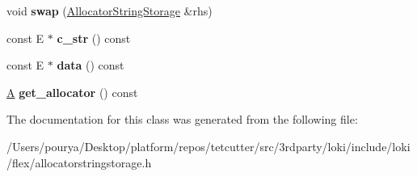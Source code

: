 \begin{DoxyCompactItemize}
\item 
\hypertarget{classAllocatorStringStorage_a39e2135b565f3984f4aba7c49b5908c2}{}void {\bfseries swap} (\hyperlink{classAllocatorStringStorage}{Allocator\+String\+Storage} \&rhs)\label{classAllocatorStringStorage_a39e2135b565f3984f4aba7c49b5908c2}

\item 
\hypertarget{classAllocatorStringStorage_ac4b99016b8ae1e57f41d56862dc9f893}{}const E $\ast$ {\bfseries c\+\_\+str} () const \label{classAllocatorStringStorage_ac4b99016b8ae1e57f41d56862dc9f893}

\item 
\hypertarget{classAllocatorStringStorage_a9fe18e9efa5b7105d36fad83ea01a5b6}{}const E $\ast$ {\bfseries data} () const \label{classAllocatorStringStorage_a9fe18e9efa5b7105d36fad83ea01a5b6}

\item 
\hypertarget{classAllocatorStringStorage_a062bf251d7a7da0bdee4e39d52fe3ad2}{}\hyperlink{structA}{A} {\bfseries get\+\_\+allocator} () const \label{classAllocatorStringStorage_a062bf251d7a7da0bdee4e39d52fe3ad2}

\end{DoxyCompactItemize}


The documentation for this class was generated from the following file\+:\begin{DoxyCompactItemize}
\item 
/\+Users/pourya/\+Desktop/platform/repos/tetcutter/src/3rdparty/loki/include/loki/flex/allocatorstringstorage.\+h\end{DoxyCompactItemize}
